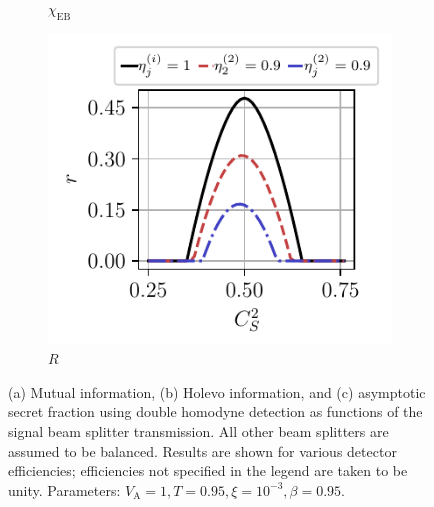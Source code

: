 \documentclass[%
reprint,
superscriptaddress,
 amsmath,amssymb,amsfonts,
 aps,
 pra,
 longbibliography
]{revtex4-2}
\newcommand{\ind}[1]{\mathrm{#1}}
\begin{document}
\begin{figure}
\begin{subfigure}[c]{.3\linewidth}
\caption[]{$\chi_{\ind{EB}}$}
\end{subfigure}
\hfill
    \begin{subfigure}[c]{.3\linewidth}
\includegraphics[width=\linewidth, trim={.2cm .3cm .4cm .35cm},clip]{pics/qkd/dhom/r.pdf}
\caption[]{$R$}
        \end{subfigure}
        \caption{(a) Mutual information, (b) Holevo information, and (c) asymptotic secret fraction using double homodyne detection as functions of the signal beam splitter transmission. All other beam splitters are assumed to be balanced. Results are shown for various detector efficiencies; efficiencies not specified in the legend are taken to be unity. Parameters: $V_{\ind{A}}=1, T=0.95, \xi=10^{-3}, \beta=0.95$.
}
\label{fig:double-homodyne-all}
\end{figure}
\end{document}
